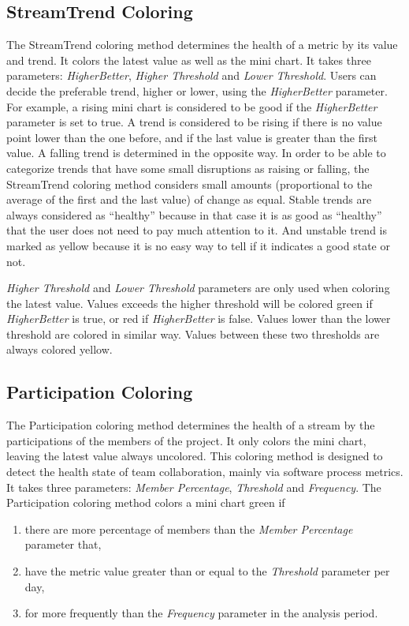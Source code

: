 \subsection{StreamTrend Coloring} 
The StreamTrend coloring method determines the health of a metric by its value and trend. It colors the latest value as well as the mini chart. It takes three parameters: {\it HigherBetter}, {\it Higher Threshold} and {\it Lower Threshold}. Users can decide the preferable trend, higher or lower, using the {\it HigherBetter} parameter. For example, a rising mini chart is considered to be good if the {\it HigherBetter} parameter is set to true. A trend is considered to be rising if there is no value point lower than the one before, and if the last value is greater than the first value. A falling trend is determined in the opposite way. In order to be able to categorize trends that have some small disruptions as raising or falling, the StreamTrend coloring method considers small amounts (proportional to the average of the first and the last value) of change as equal. Stable trends are always considered as ``healthy'' because in that case it is as good as ``healthy'' that the user does not need to pay much attention to it. And unstable trend is marked as yellow because it is no easy way to tell if it indicates a good state or not. 

{\it Higher Threshold} and {\it Lower Threshold} parameters are only used when coloring the latest value. Values exceeds the higher threshold will be colored green if {\it HigherBetter} is true, or red if {\it HigherBetter} is false. Values lower than the lower threshold are colored in similar way. Values between these two thresholds are always colored yellow.

\subsection{Participation Coloring}
The Participation coloring method determines the health of a stream by the participations of the members of the project. It only colors the mini chart, leaving the latest value always uncolored. This coloring method is designed to detect the health state of team collaboration, mainly via software process metrics. It takes three parameters: {\it Member Percentage}, {\it Threshold} and {\it Frequency}. The Participation coloring method colors a mini chart green if 
\begin{enumerate}
\item there are more percentage of members than the {\it Member Percentage} parameter that,
\item have the metric value greater than or equal to the {\it Threshold} parameter per day,
\item for more frequently than the {\it Frequency} parameter in the analysis period.
\end{enumerate}

